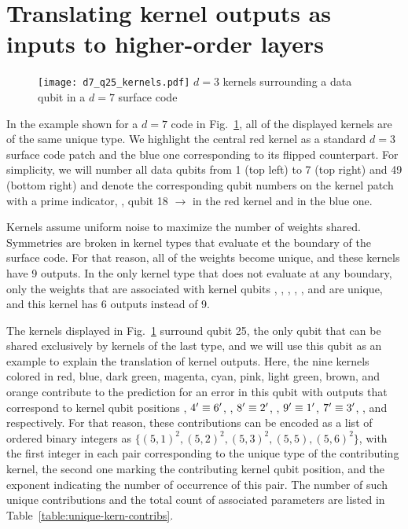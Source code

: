 \section{Translating kernel outputs as inputs to higher-order layers}

\begin{figure*}[htb]
\centering
\texttt{[image: d7\_q25\_kernels.pdf]}
\ccaption
{$d=3$ kernels surrounding a data qubit in a $d=7$ surface code}
{
}
\label{fig:d7wkern}
\end{figure*}

In the example shown for a $d=7$ code in Fig.~\ref{fig:d7wkern}, all of the displayed kernels are of the same unique type. We highlight the central red kernel as a standard $d=3$ surface code patch and the blue one corresponding to its flipped counterpart. For simplicity, we will number all data qubits from 1 (top left) to 7 (top right) and 49 (bottom right) and denote the corresponding qubit numbers on the kernel patch with a prime indicator, \eg, qubit 18 $\rightarrow$  in the red kernel and  in the blue one.

Kernels assume uniform noise to maximize the number of weights shared. Symmetries are broken in kernel types that evaluate et the boundary of the surface code. For that reason, all of the weights become unique, and these kernels have 9 outputs. In the only kernel type that does not evaluate at any boundary, only the weights that are associated with kernel qubits , , , , , and  are unique, and this kernel has 6 outputs instead of 9.

The kernels displayed in Fig.~\ref{fig:d7wkern} surround qubit 25, the only qubit that can be shared exclusively by kernels of the last type, and we will use this qubit as an example to explain the translation of kernel outputs. Here, the nine kernels colored in red, blue, dark green, magenta, cyan, pink, light green, brown, and orange contribute to the prediction for an error in this qubit with outputs that correspond to kernel qubit positions , $4^\prime\equiv6^\prime$, , $8^\prime\equiv2^\prime$, , $9^\prime\equiv1^\prime$, $7^\prime\equiv3^\prime$, , and  respectively. For that reason, these contributions can be encoded as a list of ordered binary integers as $\{(5,1)^2, (5,2)^2, (5,3)^2, (5,5), (5,6)^2\}$, with the first integer in each pair corresponding to the unique type of the contributing kernel, the second one marking the contributing kernel qubit position, and the exponent indicating the number of occurrence of this pair. The number of such unique contributions and the total count of associated parameters are listed in Table~\ref{table:unique-kern-contribs}.

